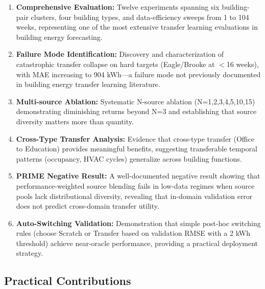 \documentclass[12pt,a4paper]{report}
\begin{document}
\begin{enumerate}
    \item \textbf{Comprehensive Evaluation:} Twelve experiments spanning six building-pair clusters, four building types, and data-efficiency sweeps from 1 to 104 weeks, representing one of the most extensive transfer learning evaluations in building energy forecasting.
    
    \item \textbf{Failure Mode Identification:} Discovery and characterization of catastrophic transfer collapse on hard targets (Eagle/Brooke at $<$16 weeks), with MAE increasing to 904 kWh—a failure mode not previously documented in building energy transfer learning literature.
    
    \item \textbf{Multi-source Ablation:} Systematic N-source ablation (N=1,2,3,4,5,10,15) demonstrating diminishing returns beyond N=3 and establishing that source diversity matters more than quantity.
    
    \item \textbf{Cross-Type Transfer Analysis:} Evidence that cross-type transfer (Office to Education) provides meaningful benefits, suggesting transferable temporal patterns (occupancy, HVAC cycles) generalize across building functions.
    
    \item \textbf{PRIME Negative Result:} A well-documented negative result showing that performance-weighted source blending fails in low-data regimes when source pools lack distributional diversity, revealing that in-domain validation error does not predict cross-domain transfer utility.
    
    \item \textbf{Auto-Switching Validation:} Demonstration that simple post-hoc switching rules (choose Scratch or Transfer based on validation RMSE with a 2 kWh threshold) achieve near-oracle performance, providing a practical deployment strategy.
\end{enumerate}

\subsection{Practical Contributions}
\end{document}
